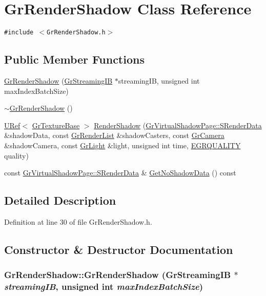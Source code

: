 \hypertarget{class_gr_render_shadow}{
\section{GrRenderShadow Class Reference}
\label{class_gr_render_shadow}
}
{\tt \#include $<$GrRenderShadow.h$>$}

\subsection*{Public Member Functions}
\begin{CompactItemize}
\item 
\hyperlink{class_gr_render_shadow_78428e5b0de23f0824717a295a8d74f6}{GrRenderShadow} (\hyperlink{class_gr_streaming_i_b}{GrStreamingIB} $\ast$streamingIB, unsigned int maxIndexBatchSize)
\item 
\hyperlink{class_gr_render_shadow_ebc5b2d3b47785bd1d08f2626a7c9a2e}{$\sim$GrRenderShadow} ()
\item 
\hyperlink{class_u_ref}{URef}$<$ \hyperlink{class_gr_texture_base}{GrTextureBase} $>$ \hyperlink{class_gr_render_shadow_96026faa3feecbc650de41111af57c28}{RenderShadow} (\hyperlink{struct_gr_virtual_shadow_page_1_1_s_render_data}{GrVirtualShadowPage::SRenderData} \&shadowData, const \hyperlink{class_gr_render_list}{GrRenderList} \&shadowCasters, const \hyperlink{class_gr_camera}{GrCamera} \&shadowCamera, const \hyperlink{class_gr_light}{GrLight} \&light, unsigned int time, \hyperlink{enums_8h_697c1ee1354746841860d5bf9f81c033}{EGRQUALITY} quality)
\item 
const \hyperlink{struct_gr_virtual_shadow_page_1_1_s_render_data}{GrVirtualShadowPage::SRenderData} \& \hyperlink{class_gr_render_shadow_836cfd49a9e481c14049afb1fc7e3165}{GetNoShadowData} () const 
\end{CompactItemize}


\subsection{Detailed Description}


Definition at line 30 of file GrRenderShadow.h.

\subsection{Constructor \& Destructor Documentation}
\hypertarget{class_gr_render_shadow_78428e5b0de23f0824717a295a8d74f6}{
\subsubsection[{GrRenderShadow}]{\setlength{\rightskip}{0pt plus 5cm}GrRenderShadow::GrRenderShadow ({\bf GrStreamingIB} $\ast$ {\em streamingIB}, \/  unsigned int {\em maxIndexBatchSize})}}
\label{class_gr_render_shadow_78428e5b0de23f0824717a295a8d74f6}




